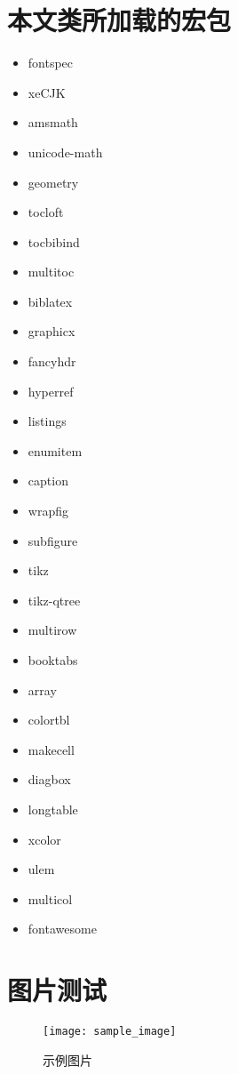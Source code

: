 \section{本文类所加载的宏包}
\begin{multicols}{4}
    \begin{itemize}
        \item fontspec
        \item xeCJK
        \item amsmath
        \item unicode-math
        \item geometry
        \item tocloft
        \item tocbibind
        \item multitoc
        \item biblatex
        \item graphicx
        \item fancyhdr
        \item hyperref
        \item listings
        \item enumitem
        \item caption
        \item wrapfig
        \item subfigure
        \item tikz
        \item tikz-qtree
        \item multirow
        \item booktabs
        \item array
        \item colortbl
        \item makecell
        \item diagbox
        \item longtable
        \item xcolor
        \item ulem
        \item multicol
        \item fontawesome
    \end{itemize}
\end{multicols}

\section{图片测试}
\sampletext

\begin{figure}[h!]
    \centering
    \texttt{[image: sample\_image]}
    \caption{示例图片}
\end{figure}

